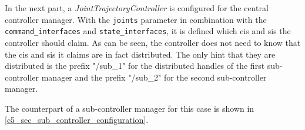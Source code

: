 In the next part, a \textit{JointTrajectoryController} is configured for the central controller manager. With the \lstset{language=yaml,basicstyle=\small\ttfamily, breaklines=true}\lstinline{joints} parameter in combination with the 
\lstset{language=yaml,basicstyle=\small\ttfamily, breaklines=true}\lstinline{command_interfaces} and \lstset{language=yaml,basicstyle=\small\ttfamily, breaklines=true}\lstinline{state_interfaces}, it is defined which \glspl{ci} and \glspl{si} the controller should claim. As can be seen, the controller does not need to know that the \glspl{ci} and \glspl{si} it claims are in fact distributed. The only hint that they are distributed is the prefix "/sub\_1" for the distributed \glspl{handle} of the first sub-controller manager and the prefix "/sub\_2" for the second sub-controller manager.\

The counterpart of a sub-controller manager for this case is shown in \autoref{c5_sec_sub_controller_configuration}.

